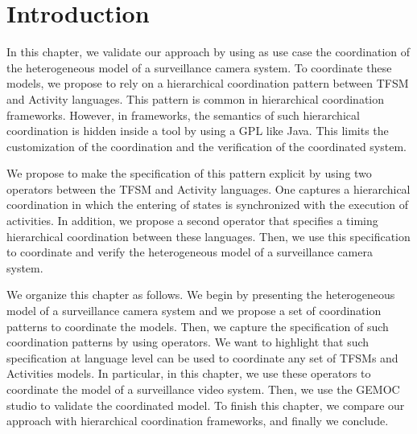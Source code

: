 \section{Introduction}
In this chapter, we validate our approach by using as use case the coordination of the heterogeneous model of a surveillance camera system. To coordinate these models, we propose to rely on a hierarchical coordination pattern between TFSM and Activity languages. This pattern is common in hierarchical coordination frameworks. However, in frameworks, the semantics of such hierarchical coordination is hidden inside a tool by using a GPL like Java. This limits the customization of the coordination and the verification of the coordinated system.  

We propose to make the specification of this pattern explicit by using two \bcool operators between the TFSM and Activity languages. One captures a hierarchical coordination in which the entering of states is synchronized with the execution of activities. In addition, we propose a second operator that specifies a timing hierarchical coordination between these languages. Then, we use this specification to coordinate and verify the heterogeneous model of a surveillance camera system. 

We organize this chapter as follows. We begin by presenting the heterogeneous model of a surveillance camera system and we propose a set of coordination patterns to coordinate the models. Then, we capture the specification of such coordination patterns by using \bcool operators. We want to highlight that such specification at language level can be used to coordinate any set of TFSMs and Activities models. In particular, in this chapter, we use these operators to coordinate the model of a surveillance video system. Then, we use the GEMOC studio to validate the coordinated model. To finish this chapter, we compare our approach with hierarchical coordination frameworks, and finally we conclude.  